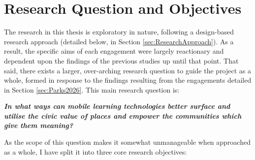 \section{Research Question and Objectives}
\label{sec:ResearchQuestions}

The research in this thesis is exploratory in nature, following a design-based research approach (detailed below, in Section \ref{sec:ResearchApproach}). As a result, the specific aims of each engagement were largely reactionary and dependent upon the findings of the previous studies up until that point. That said, there exists a larger, over-arching research question to guide the project as a whole, formed in response to the findings resulting from the engagements detailed in Section \ref{sec:Parks2026}. This main research question is:

\begin{displayquote}
\textit{\textbf{In what ways can mobile learning technologies better surface and utilise the civic value of places and empower the communities which give them meaning?}}
\end{displayquote}

As the scope of this question makes it somewhat unmanageable when approached as a whole, I have split it into three core research objectives:

